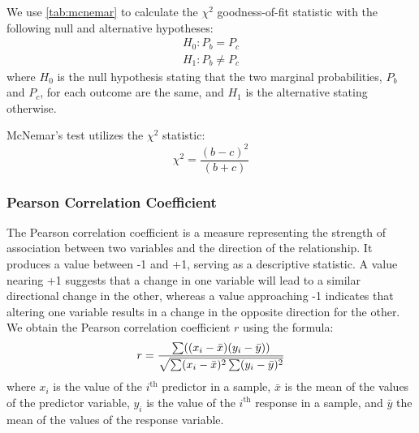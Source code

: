 We use \cref{tab:mcnemar} to calculate the $\chi^2$ goodness-of-fit statistic with the following null and alternative hypotheses:
\begin{equation}
\begin{array}{c}
	H_0: P_b = P_c   \\
	H_1: P_b \neq P_c  
\end{array}
\end{equation}
where \(H_0\) is the null hypothesis stating that the two marginal probabilities, $P_b$ and $P_c$, for each outcome are the same, and \(H_1\) is the alternative stating otherwise.

McNemar's test utilizes the $\chi^2$ statistic:
\begin{equation}
	\chi^2 = \frac{(b-c)^2}{(b + c)}
\end{equation}

\subsubsection{Pearson Correlation Coefficient}
\hfill \break
The Pearson correlation coefficient is a measure representing the strength of association between two variables and the direction of the relationship. It produces a value between -1 and +1, serving as a descriptive statistic. A value nearing +1 suggests that a change in one variable will lead to a similar directional change in the other, whereas a value approaching -1 indicates that altering one variable results in a change in the opposite direction for the other. We obtain the Pearson correlation coefficient $r$ using the formula:
\begin{equation}
	 r = \frac{\sum((x_i - \Bar{x})(y_i - \Bar{y}))}{\sqrt{\sum(x_i - \Bar{x})^2\sum(y_i - \Bar{y})^2}}
\end{equation}
where $x_i$ is the value of the $i^\mathrm{th}$ predictor in a sample, $\bar{x}$ is the mean of the values of the predictor variable, $y_i$ is the value of the $i^\mathrm{th}$ response in a sample, and $\bar{y}$ the mean of the values of the response variable.

